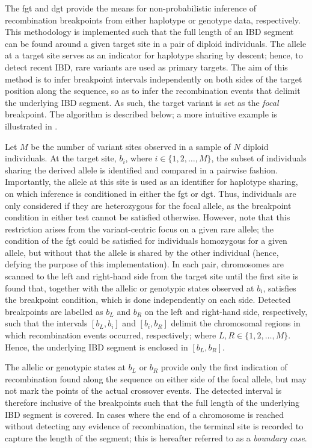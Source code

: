 The \gls{fgt} and \gls{dgt} provide the means for non-probabilistic inference of recombination breakpoints from either haplotype or genotype data, respectively.
This methodology is implemented such that the full length of an IBD segment can be found around a given target site in a pair of diploid individuals.
The allele at a target site serves as an indicator for haplotype sharing by descent; hence, to detect recent IBD, rare variants are used as primary targets.
The aim of this method is to infer breakpoint intervals independently on both sides of the target position along the sequence, so as to infer the  recombination events that delimit the underlying IBD segment.
As such, the target variant is set as the \emph{focal} breakpoint.
The algorithm is described below; a more intuitive example is illustrated in .

%

%

Let $M$ be the number of variant sites observed in a sample of $N$ diploid individuals.
At the target site, $b_{i}$, where ${i \in \lbrace 1, 2, \ldots, M \rbrace}$, the subset of individuals sharing the derived allele is identified and compared in a pairwise fashion.
Importantly, the allele at this site is used as an identifier for haplotype sharing, on which inference is conditioned in either the \gls{fgt} or \gls{dgt}.
Thus, individuals are only considered if they are heterozygous for the focal allele, as the breakpoint condition in either test cannot be satisfied otherwise.
However, note that this restriction arises from the variant-centric focus on a given rare allele; \eg the condition of the \gls{fgt} could be satisfied for individuals homozygous for a given allele, but without that the allele is shared by the other individual (hence, defying the purpose of this implementation).
In each pair, chromosomes are scanned to the left and right-hand side from the target site until the first site is found that, together with the allelic or genotypic states observed at $b_{i}$, satisfies the breakpoint condition, which is done independently on each side.
Detected breakpoints are labelled as $b_{L}$ and $b_{R}$ on the left and right-hand side, respectively, such that the intervals ${[b_{L}, b_{i}]}$ and ${[b_{i}, b_{R}]}$ delimit the chromosomal regions in which recombination events occurred, respectively; where ${L,R \in \lbrace 1, 2, \ldots, M \rbrace}$.
Hence, the underlying IBD segment is enclosed in ${[b_{L}, b_{R}]}$.

The allelic or genotypic states at $b_{L}$ or $b_{R}$ provide only the first indication of recombination found along the sequence on either side of the focal allele, but may not mark the points of the actual crossover events.
The detected interval is therefore inclusive of the breakpoints such that the full length of the underlying IBD segment is covered.
In cases where the end of a chromosome is reached without detecting any evidence of recombination, the terminal site is recorded to capture the length of the segment; this is hereafter referred to as a \emph{boundary case}.



